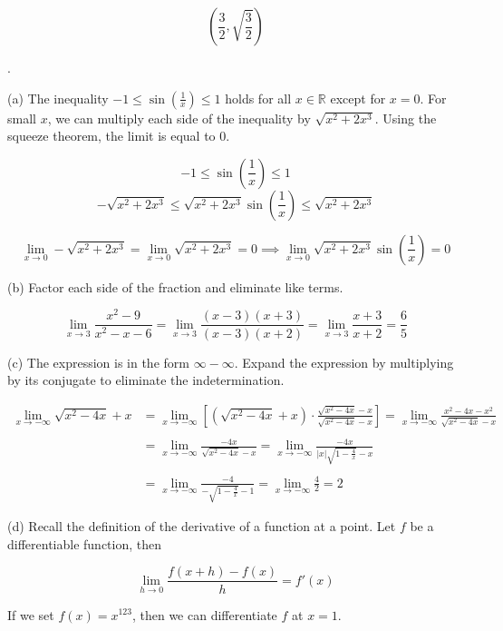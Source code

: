 \documentclass{article}
\begin{document}
\[\boxed{\left(\frac32,\sqrt{\frac32}\right)}\]

\newpage

.

\hfill

\noindent (a) The inequality $\displaystyle-1 \leq \sin\left(\frac1x\right)\leq1$ holds for all $x\in\mathbb{R}$ except for $x=0$. For small $x$, we can multiply each side of the inequality by $\sqrt{x^2+2x^3}$. Using the squeeze theorem, the limit is equal to $0$.

\[-1\leq\sin\left(\frac1x\right)\leq1\]
\[-\sqrt{x^2+2x^3}\leq\sqrt{x^2+2x^3}\sin\left(\frac1x\right)\leq\sqrt{x^2+2x^3}\]

\[\lim_{x\to0}-\sqrt{x^2+2x^3}=\lim_{x\to0}\sqrt{x^2+2x^3}=0\implies\lim_{x\to0}\sqrt{x^2+2x^3}\sin\left(\frac1x\right)=\boxed0\]

\hfill

\noindent (b) Factor each side of the fraction and eliminate like terms.

\[\lim_{x\to3}\frac{x^2-9}{x^2-x-6}=\lim_{x\to3}\frac{(x-3)(x+3)}{(x-3)(x+2)}=\lim_{x\to3}\frac{x+3}{x+2}=\boxed{\frac65}\]

\hfill

\noindent (c) The expression is in the form $\infty-\infty$. Expand the expression by multiplying by its conjugate to eliminate the indetermination.

\begin{align*}
\lim_{x\to-\infty}\sqrt{x^2-4x}+x&=\lim_{x\to-\infty}\left[\left(\sqrt{x^2-4x} + x\right) \cdot\frac{\sqrt{x^2-4x}-x}{\sqrt{x^2-4x}-x}\right]=\lim_{x\to-\infty}\frac{x^2-4x-x^2}{\sqrt{x^2-4x}-x}\\\\&=\lim_{x\to-\infty}\frac{-4x}{\sqrt{x^2-4x}-x}=\lim_{x\to-\infty}\frac{-4x}{\displaystyle |x|\sqrt{1-\frac4x}-x}\\\\&=\lim_{x\to-\infty}\frac{-4}{\displaystyle-\sqrt{1-\frac4x}-1}=\lim_{x\to-\infty}\frac42=\boxed{2}\end{align*}

\hfill

\noindent (d) Recall the definition of the derivative of a function at a point. Let $f$ be a differentiable function, then

\[\lim_{h\to 0} \frac{f(x+h)-f(x)}{h} = f'(x)\]

\hfill

\noindent If we set $f(x) = x^{123}$, then we can differentiate $f$ at $x=1$.
\end{document}
